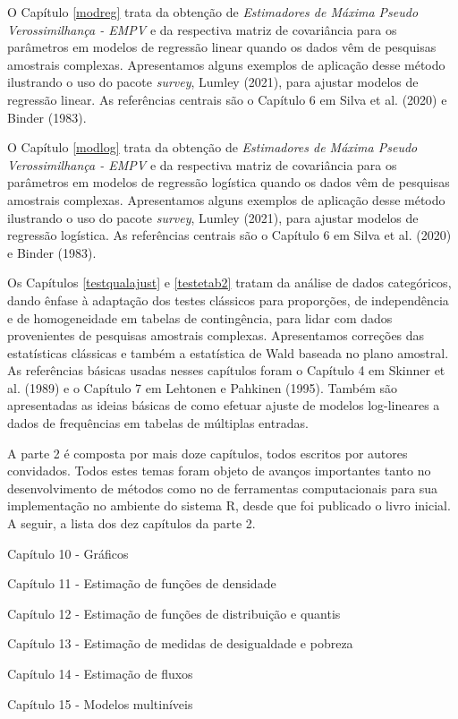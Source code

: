 \documentclass[
  12pt,
  brazilian,
]{book}
\theoremstyle{definition}
\theoremstyle{definition}
\theoremstyle{definition}
\theoremstyle{definition}
\theoremstyle{remark}
\begin{document}
O Capítulo \ref{modreg} trata da obtenção de \emph{Estimadores de Máxima Pseudo Verossimilhança - EMPV} e da respectiva matriz de covariância para os parâmetros em modelos de regressão linear quando os dados vêm de pesquisas amostrais complexas. Apresentamos alguns exemplos de aplicação desse método ilustrando o uso do pacote \emph{survey}, Lumley (2021), para ajustar modelos de regressão linear. As referências centrais são o Capítulo 6 em Silva et al. (2020) e Binder (1983).

O Capítulo \ref{modlog} trata da obtenção de \emph{Estimadores de Máxima Pseudo Verossimilhança - EMPV} e da respectiva matriz de covariância para os parâmetros em modelos de regressão logística quando os dados vêm de pesquisas amostrais complexas. Apresentamos alguns exemplos de aplicação desse método ilustrando o uso do pacote \emph{survey}, Lumley (2021), para ajustar modelos de regressão logística. As referências centrais são o Capítulo 6 em Silva et al. (2020) e Binder (1983).

Os Capítulos \ref{testqualajust} e \ref{testetab2} tratam da análise de dados
categóricos, dando ênfase à adaptação dos testes clássicos para proporções, de independência e de homogeneidade em tabelas de contingência, para lidar com dados provenientes de pesquisas amostrais complexas. Apresentamos correções das estatísticas clássicas e também a estatística de Wald baseada no plano amostral. As referências básicas usadas nesses capítulos foram o Capítulo 4 em Skinner et al. (1989) e o Capítulo 7 em Lehtonen e Pahkinen (1995). Também são apresentadas as ideias básicas de como efetuar ajuste de modelos log-lineares a dados de frequências em tabelas de múltiplas entradas.

A parte 2 é composta por mais doze capítulos, todos escritos por autores convidados. Todos estes temas foram objeto de avanços importantes tanto no desenvolvimento de métodos como no de ferramentas computacionais para sua implementação no ambiente do sistema R, desde que foi publicado o livro inicial. A seguir, a lista dos dez capítulos da parte 2.

Capítulo 10 - Gráficos

Capítulo 11 - Estimação de funções de densidade

Capítulo 12 - Estimação de funções de distribuição e quantis

Capítulo 13 - Estimação de medidas de desigualdade e pobreza

Capítulo 14 - Estimação de fluxos

Capítulo 15 - Modelos multiníveis
\end{document}
